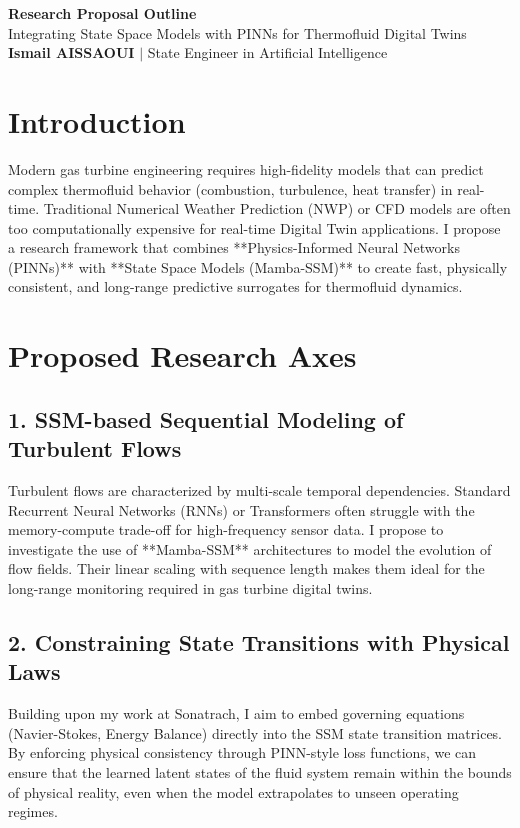 \documentclass[11pt,a4paper]{article}
\begin{document}
\begin{center}
    {\LARGE\bfseries\color{tumblue} Research Proposal Outline}\\[6pt]
    {\large Integrating State Space Models with PINNs for Thermofluid Digital Twins}\\[4pt]
    \textbf{Ismail AISSAOUI} $|$ State Engineer in Artificial Intelligence
\end{center}

\bigskip

\section{Introduction}
Modern gas turbine engineering requires high-fidelity models that can predict complex thermofluid behavior (combustion, turbulence, heat transfer) in real-time. Traditional Numerical Weather Prediction (NWP) or CFD models are often too computationally expensive for real-time Digital Twin applications. I propose a research framework that combines **Physics-Informed Neural Networks (PINNs)** with **State Space Models (Mamba-SSM)** to create fast, physically consistent, and long-range predictive surrogates for thermofluid dynamics.

\section{Proposed Research Axes}

\subsection{1. SSM-based Sequential Modeling of Turbulent Flows}
Turbulent flows are characterized by multi-scale temporal dependencies. Standard Recurrent Neural Networks (RNNs) or Transformers often struggle with the memory-compute trade-off for high-frequency sensor data. I propose to investigate the use of **Mamba-SSM** architectures to model the evolution of flow fields. Their linear scaling with sequence length makes them ideal for the long-range monitoring required in gas turbine digital twins.

\subsection{2. Constraining State Transitions with Physical Laws}
Building upon my work at Sonatrach, I aim to embed governing equations (Navier-Stokes, Energy Balance) directly into the SSM state transition matrices. By enforcing physical consistency through PINN-style loss functions, we can ensure that the learned latent states of the fluid system remain within the bounds of physical reality, even when the model extrapolates to unseen operating regimes.
\end{document}
